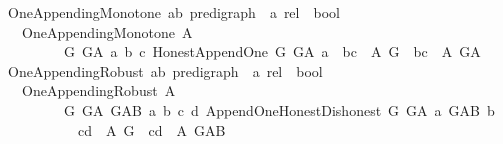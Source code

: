 \begin{isabellebody}
\ One{\isacharunderscore}{\kern0pt}Appending{\isacharunderscore}{\kern0pt}Monotone{\isacharcolon}{\kern0pt}{\isacharcolon}{\kern0pt}\ {\isachardoublequoteopen}{\isacharparenleft}{\kern0pt}{\isacharparenleft}{\kern0pt}{\isacharprime}{\kern0pt}a{\isacharcomma}{\kern0pt}{\isacharprime}{\kern0pt}b{\isacharparenright}{\kern0pt}\ pre{\isacharunderscore}{\kern0pt}digraph\ {\isasymRightarrow}\ {\isacharprime}{\kern0pt}a\ rel{\isacharparenright}{\kern0pt}\ {\isasymRightarrow}\ bool\ {\isachardoublequoteclose}\isanewline
\ \ \ {\isachardoublequoteopen}One{\isacharunderscore}{\kern0pt}Appending{\isacharunderscore}{\kern0pt}Monotone\ A\ {\isasymequiv}\isanewline
\ \ \ \ \ \ \ \ \ {\isacharparenleft}{\kern0pt}{\isasymforall}G\ G{\isacharunderscore}{\kern0pt}A\ a\ b\ c{\isachardot}{\kern0pt}\ Honest{\isacharunderscore}{\kern0pt}Append{\isacharunderscore}{\kern0pt}One\ G\ G{\isacharunderscore}{\kern0pt}A\ a\ {\isasymlongrightarrow}\ {\isacharparenleft}{\kern0pt}{\isacharparenleft}{\kern0pt}b{\isacharcomma}{\kern0pt}c{\isacharparenright}{\kern0pt}\ {\isasymin}\ {\isacharparenleft}{\kern0pt}A\ G{\isacharparenright}{\kern0pt}\ {\isasymlongrightarrow}\ {\isacharparenleft}{\kern0pt}b{\isacharcomma}{\kern0pt}c{\isacharparenright}{\kern0pt}\ {\isasymin}\ {\isacharparenleft}{\kern0pt}A\ G{\isacharunderscore}{\kern0pt}A{\isacharparenright}{\kern0pt}{\isacharparenright}{\kern0pt}{\isacharparenright}{\kern0pt}{\isachardoublequoteclose}\isanewline
\isanewline
\isanewline
{}\isamarkupfalse%
\ One{\isacharunderscore}{\kern0pt}Appending{\isacharunderscore}{\kern0pt}Robust{\isacharcolon}{\kern0pt}{\isacharcolon}{\kern0pt}\ {\isachardoublequoteopen}{\isacharparenleft}{\kern0pt}{\isacharparenleft}{\kern0pt}{\isacharprime}{\kern0pt}a{\isacharcomma}{\kern0pt}{\isacharprime}{\kern0pt}b{\isacharparenright}{\kern0pt}\ pre{\isacharunderscore}{\kern0pt}digraph\ {\isasymRightarrow}\ {\isacharprime}{\kern0pt}a\ rel{\isacharparenright}{\kern0pt}\ {\isasymRightarrow}\ bool\ {\isachardoublequoteclose}\isanewline
\ \ \ {\isachardoublequoteopen}One{\isacharunderscore}{\kern0pt}Appending{\isacharunderscore}{\kern0pt}Robust\ A\ {\isasymequiv}\isanewline
\ \ \ \ \ \ \ \ \ {\isacharparenleft}{\kern0pt}{\isasymforall}G\ G{\isacharunderscore}{\kern0pt}A\ G{\isacharunderscore}{\kern0pt}AB\ a\ b\ c\ d{\isachardot}{\kern0pt}\ Append{\isacharunderscore}{\kern0pt}One{\isacharunderscore}{\kern0pt}Honest{\isacharunderscore}{\kern0pt}Dishonest\ G\ G{\isacharunderscore}{\kern0pt}A\ a\ G{\isacharunderscore}{\kern0pt}AB\ b\isanewline
\ \ \ \ \ \ \ \ \ \ {\isasymlongrightarrow}\ {\isacharparenleft}{\kern0pt}{\isacharparenleft}{\kern0pt}c{\isacharcomma}{\kern0pt}d{\isacharparenright}{\kern0pt}\ {\isasymin}\ {\isacharparenleft}{\kern0pt}A\ G{\isacharparenright}{\kern0pt}\ {\isasymlongrightarrow}\ {\isacharparenleft}{\kern0pt}c{\isacharcomma}{\kern0pt}d{\isacharparenright}{\kern0pt}\ {\isasymin}\ {\isacharparenleft}{\kern0pt}A\ G{\isacharunderscore}{\kern0pt}AB{\isacharparenright}{\kern0pt}{\isacharparenright}{\kern0pt}{\isacharparenright}{\kern0pt}{\isachardoublequoteclose}\isanewline

\end{isabellebody}
